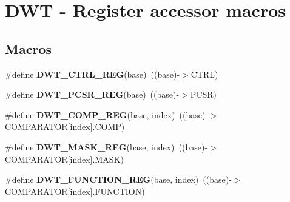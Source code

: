 \hypertarget{group___d_w_t___register___accessor___macros}{}\section{D\+WT -\/ Register accessor macros}
\label{group___d_w_t___register___accessor___macros}
\subsection*{Macros}
\begin{DoxyCompactItemize}
\item 
\mbox{\label{group___d_w_t___register___accessor___macros_ga192b161c98f2e5a72cff8d88f20d3f69}} 
\#define {\bfseries D\+W\+T\+\_\+\+C\+T\+R\+L\+\_\+\+R\+EG}(base)~((base)-\/$>$C\+T\+RL)
\item 
\mbox{\label{group___d_w_t___register___accessor___macros_ga3609d57752ff1006c962eed5c540e9b7}} 
\#define {\bfseries D\+W\+T\+\_\+\+P\+C\+S\+R\+\_\+\+R\+EG}(base)~((base)-\/$>$P\+C\+SR)
\item 
\mbox{\label{group___d_w_t___register___accessor___macros_ga65ba817e15fd964c25a32b392e4bd8a6}} 
\#define {\bfseries D\+W\+T\+\_\+\+C\+O\+M\+P\+\_\+\+R\+EG}(base,  index)~((base)-\/$>$C\+O\+M\+P\+A\+R\+A\+T\+OR\mbox{[}index\mbox{]}.C\+O\+MP)
\item 
\mbox{\label{group___d_w_t___register___accessor___macros_gadc3b258970e8d8b6fac9ed997705979b}} 
\#define {\bfseries D\+W\+T\+\_\+\+M\+A\+S\+K\+\_\+\+R\+EG}(base,  index)~((base)-\/$>$C\+O\+M\+P\+A\+R\+A\+T\+OR\mbox{[}index\mbox{]}.M\+A\+SK)
\item 
\mbox{\label{group___d_w_t___register___accessor___macros_ga8c031182a80181fe644b6ae21491966a}} 
\#define {\bfseries D\+W\+T\+\_\+\+F\+U\+N\+C\+T\+I\+O\+N\+\_\+\+R\+EG}(base,  index)~((base)-\/$>$C\+O\+M\+P\+A\+R\+A\+T\+OR\mbox{[}index\mbox{]}.F\+U\+N\+C\+T\+I\+ON)
\item 
\mbox{\label{group___d_w_t___register___accessor___macros_ga90b9ebedff8635727698afd2fa84b90a}} 

\end{DoxyCompactItemize}
